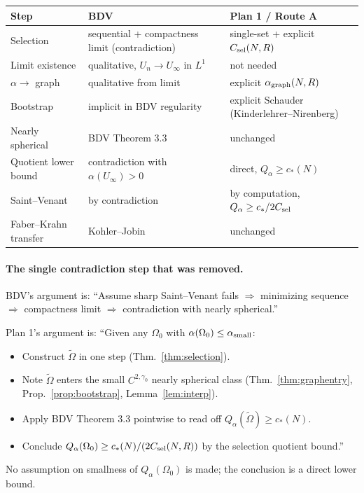 \documentclass[11pt]{article}
\theoremstyle{definition}
\begin{document}
\begin{center}
\begin{tabular}{lll}
\hline
Step & BDV & Plan 1 / Route A \\
\hline
Selection & sequential + compactness limit (contradiction) &
  single-set + explicit $C_{\rm sel}(N,R)$ \\
Limit existence & qualitative, $U_n\to U_\infty$ in $L^1$ &
  not needed \\
$\alpha\to$ graph & qualitative from limit & explicit $\alpha_{\rm graph}(N,R)$ \\
Bootstrap & implicit in BDV regularity & explicit Schauder
  (Kinderlehrer--Nirenberg) \\
Nearly spherical & BDV Theorem 3.3 & unchanged \\
Quotient lower bound & contradiction with $\alpha(U_\infty)>0$ &
  direct, $Q_\alpha\ge c_*(N)$ \\
Saint--Venant & by contradiction & by computation,
  $Q_\alpha\ge c_*/2C_{\rm sel}$ \\
Faber--Krahn transfer & Kohler--Jobin & unchanged \\
\hline
\end{tabular}
\end{center}

\paragraph{The single contradiction step that was removed.}
BDV's argument is:
``Assume sharp Saint--Venant fails $\Rightarrow$ minimizing sequence
$\Rightarrow$ compactness limit $\Rightarrow$ contradiction with nearly spherical.''

Plan 1's argument is:
``Given any $\Omega_0$ with $\alpha(\Omega_0)\le\alpha_{\rm small}$:
\begin{itemize}
\item Construct $\widetilde\Omega$ in one step (Thm.~\ref{thm:selection}).
\item Note $\widetilde\Omega$ enters the small $C^{2,\gamma_0}$ nearly
spherical class (Thm.~\ref{thm:graphentry}, Prop.~\ref{prop:bootstrap},
Lemma~\ref{lem:interp}).
\item Apply BDV Theorem 3.3 pointwise to read off
$Q_\alpha(\widetilde\Omega)\ge c_*(N)$.
\item Conclude $Q_\alpha(\Omega_0)\ge c_*(N)/(2C_{\rm sel}(N,R))$
by the selection quotient bound.''
\end{itemize}
No assumption on smallness of $Q_\alpha(\Omega_0)$ is made; the conclusion
is a direct lower bound.
\end{document}
